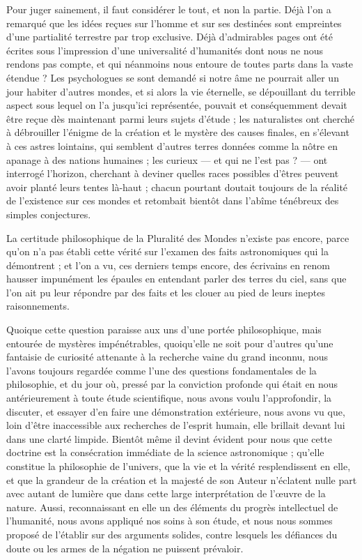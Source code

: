 \documentclass[a4paper, 11pt, oneside]{article}
\begin{document}
Pour juger sainement, il faut considérer le tout, et non la partie. Déjà l'on a remarqué que les idées reçues sur l'homme et sur ses destinées sont empreintes d'une partialité terrestre par trop exclusive. Déjà d'admirables pages ont été écrites sous l'impression d'une universalité d'humanités dont nous ne nous rendons pas compte, et qui néanmoins nous entoure de toutes parts dans la vaste étendue ? Les psychologues se sont demandé si notre âme ne pourrait aller un jour habiter d'autres mondes, et si alors la vie éternelle, se dépouillant du terrible aspect sous lequel on l'a jusqu'ici représentée, pouvait et conséquemment devait être reçue dès maintenant parmi leurs sujets d'étude ; les naturalistes ont cherché à débrouiller l'énigme de la création et le mystère des causes finales, en s'élevant à ces astres lointains, qui semblent d'autres terres données comme la nôtre en apanage à des nations humaines ; les curieux --- et qui ne l'est pas ? --- ont interrogé l'horizon, cherchant à deviner quelles races possibles d'êtres peuvent avoir planté leurs tentes là-haut ; chacun pourtant doutait toujours de la réalité de l'existence sur ces mondes et retombait bientôt dans l'abîme ténébreux des simples conjectures.

La certitude philosophique de la Pluralité des Mondes n'existe pas encore, parce qu'on n'a pas établi cette vérité sur l'examen des faits astronomiques qui la démontrent ; et l'on a vu, ces derniers temps encore, des écrivains en renom hausser impunément les épaules en entendant parler des terres du ciel, sans que l'on ait pu leur répondre par des faits et les clouer au pied de leurs ineptes raisonnements.

Quoique cette question paraisse aux uns d'une portée philosophique, mais entourée de mystères impénétrables, quoiqu'elle ne soit pour d'autres qu'une fantaisie de curiosité attenante à la recherche vaine du grand inconnu, nous l'avons toujours regardée comme l'une des questions fondamentales de la philosophie, et du jour où, pressé par la conviction profonde qui était en nous antérieurement à toute étude scientifique, nous avons voulu l'approfondir, la discuter, et essayer d'en faire une démonstration extérieure, nous avons vu que, loin d'être inaccessible aux recherches de l'esprit humain, elle brillait devant lui dans une clarté limpide. Bientôt même il devint évident pour nous que cette doctrine est la consécration immédiate de la science astronomique ; qu'elle constitue la philosophie de l'univers, que la vie et la vérité resplendissent en elle, et que la grandeur de la création et la majesté de son Auteur n'éclatent nulle part avec autant de lumière que dans cette large interprétation de l'œuvre de la nature. Aussi, reconnaissant en elle un des éléments du progrès intellectuel de l'humanité, nous avons appliqué nos soins à son étude, et nous nous sommes proposé de l'établir sur des arguments solides, contre lesquels les défiances du doute ou les armes de la négation ne puissent prévaloir.
\end{document}
